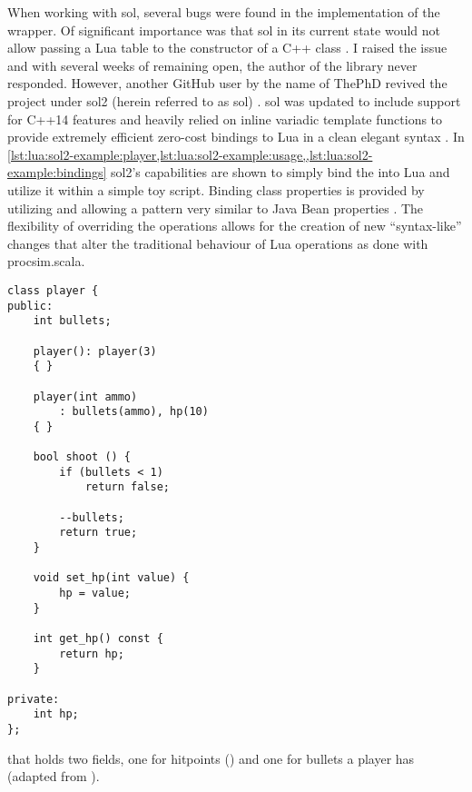 When working with sol, several bugs were found in the implementation of the wrapper. Of significant importance was that sol in its current state would not allow passing a Lua table to the constructor of a C++ class \cite{Github:Rapptz:Sol:74}. I raised the issue and with several weeks of remaining open, the author of the library never responded. However, another GitHub user by the name of ThePhD revived the project under sol2 (herein referred to as sol) \cite{Github:ThePhD:sol2}. sol was updated to include support for C++14 features and heavily relied on inline variadic template functions to provide extremely efficient zero-cost bindings to Lua in a clean elegant syntax \cite{Github:ThePhD:sol2:benchmarks, Github:ThePhD:sol2:cxx-in-lua}. In \cref{lst:lua:sol2-example:player,lst:lua:sol2-example:usage,,lst:lua:sol2-example:bindings} sol2's capabilities are shown to simply bind the  into Lua and utilize it within a simple toy script. Binding class properties is provided by utilizing  and  allowing a pattern very similar to Java Bean properties \cite{Oracle:JavaTutorial:JavaBeans}. The flexibility of overriding the operations allows for the creation of new ``syntax-like'' changes that alter the traditional behaviour of Lua operations as done with procsim.scala.

\begin{listing}[hp]
\begin{verbatim}
class player {
public:
    int bullets;
    
    player(): player(3) 
    { }
    
    player(int ammo)
        : bullets(ammo), hp(10)
    { }
    
    bool shoot () {
        if (bullets < 1) 
            return false;
    
        --bullets;
        return true;
    }
    
    void set_hp(int value) {
        hp = value;
    }
    
    int get_hp() const {
        return hp;
    }
    
private:
    int hp;
};
\end{verbatim}
\caption{ that holds two fields, one for hitpoints () and one for bullets a player has (adapted from \cite{Github:ThePhD:sol2:cxx-in-lua}).}
\label{lst:lua:sol2-example:player}
\end{listing}


